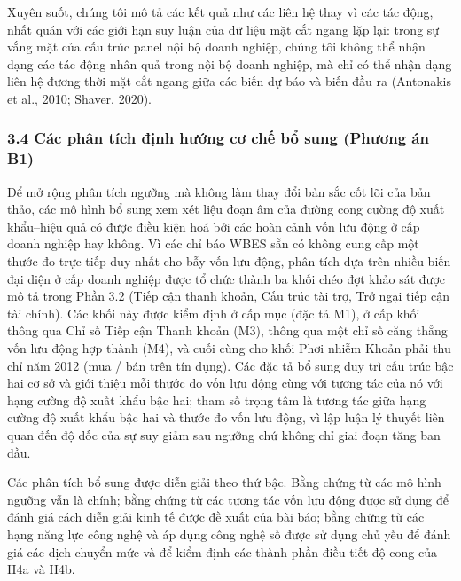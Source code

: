 \documentclass[12pt,a4paper]{article}
\begin{document}
Xuyên suốt, chúng tôi mô tả các kết quả như các liên hệ thay vì các tác
động, nhất quán với các giới hạn suy luận của dữ liệu mặt cắt ngang lặp
lại: trong sự vắng mặt của cấu trúc panel nội bộ doanh nghiệp, chúng tôi
không thể nhận dạng các tác động nhân quả trong nội bộ doanh nghiệp, mà
chỉ có thể nhận dạng liên hệ đương thời mặt cắt ngang giữa các biến dự
báo và biến đầu ra (Antonakis et al., 2010; Shaver, 2020).

\hypertarget{34-cuxe1c-phuxe2n-tuxedch-ux111ux1ecbnh-hux1b0ux1edbng-cux1a1-chux1ebf-bux1ed5-sung-phux1b0ux1a1ng-uxe1n-b1}{%
\subsubsection{3.4 Các phân tích định hướng cơ chế bổ sung (Phương án
B1)}\label{34-cuxe1c-phuxe2n-tuxedch-ux111ux1ecbnh-hux1b0ux1edbng-cux1a1-chux1ebf-bux1ed5-sung-phux1b0ux1a1ng-uxe1n-b1}}

Để mở rộng phân tích ngưỡng mà không làm thay đổi bản sắc cốt lõi của
bản thảo, các mô hình bổ sung xem xét liệu đoạn âm của đường cong cường
độ xuất khẩu--hiệu quả có được điều kiện hoá bởi các hoàn cảnh vốn lưu
động ở cấp doanh nghiệp hay không. Vì các chỉ báo WBES sẵn có không cung
cấp một thước đo trực tiếp duy nhất cho bẫy vốn lưu động, phân tích dựa
trên nhiều biến đại diện ở cấp doanh nghiệp được tổ chức thành ba khối
chéo đợt khảo sát được mô tả trong Phần 3.2 (Tiếp cận thanh khoản, Cấu
trúc tài trợ, Trở ngại tiếp cận tài chính). Các khối này được kiểm định
ở cấp mục (đặc tả M1), ở cấp khối thông qua Chỉ số Tiếp cận Thanh khoản
(M3), thông qua một chỉ số căng thẳng vốn lưu động hợp thành (M4), và
cuối cùng cho khối Phơi nhiễm Khoản phải thu chỉ năm 2012 (mua / bán
trên tín dụng). Các đặc tả bổ sung duy trì cấu trúc bậc hai cơ sở và
giới thiệu mỗi thước đo vốn lưu động cùng với tương tác của nó với hạng
cường độ xuất khẩu bậc hai; tham số trọng tâm là tương tác giữa hạng
cường độ xuất khẩu bậc hai và thước đo vốn lưu động, vì lập luận lý
thuyết liên quan đến độ dốc của sự suy giảm sau ngưỡng chứ không chỉ
giai đoạn tăng ban đầu.

Các phân tích bổ sung được diễn giải theo thứ bậc. Bằng chứng từ các mô
hình ngưỡng vẫn là chính; bằng chứng từ các tương tác vốn lưu động được
sử dụng để đánh giá cách diễn giải kinh tế được đề xuất của bài báo;
bằng chứng từ các hạng năng lực công nghệ và áp dụng công nghệ số được
sử dụng chủ yếu để đánh giá các dịch chuyển mức và để kiểm định các
thành phần điều tiết độ cong của H4a và H4b.
\end{document}
